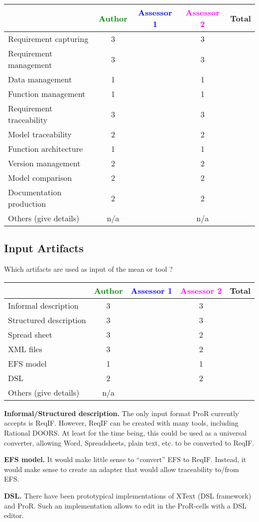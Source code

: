 \begin{tabular}{|l | c | c | c | c|}
\hline
& \textcolor{green}{Author} & \textcolor{blue}{Assessor 1} & \textcolor{magenta}{Assessor 2} & Total \\
\hline
Requirement capturing & 3 & & 3 &  \\
\hline
Requirement management  & 3 & & 3 & \\
\hline
Data management & 1 & & 1 & \\
\hline
Function management & 1 & & 1 & \\
\hline
Requirement traceability  & 3 & & 3 & \\
\hline
Model traceability & 2 & & 2 & \\
\hline
Function architecture & 1 & & 1 & \\
\hline
Version management & 2 & & 2 & \\
\hline
Model comparison & 2 & & 2 & \\
\hline
Documentation production & 2 & & 2 & \\
\hline
Others (give details) & n/a & & n/a & \\
\hline
\end{tabular}

\subsection{Input Artifacts}

Which artifacts are used as input of the mean or tool  ?


\begin{tabular}{|l | c | c | c | c|}
\hline
& \textcolor{green}{Author} & \textcolor{blue}{Assessor 1} & \textcolor{magenta}{Assessor 2} & Total \\
\hline
Informal description & 3 & & 3 &  \\
\hline
Structured description & 3 & & 3 & \\
\hline
Spread sheet & 3 & & 2 & \\
\hline
XML files & 3 & & 2 & \\
\hline
EFS model & 1 & & 1 & \\
\hline
DSL & 2 & & 2 & \\
\hline
Others (give details) & n/a & & & \\
\hline
\end{tabular}

\begin{author_comment}

\textbf{Informal/Structured description.} The only input format ProR currently accepts is ReqIF.  However, ReqIF can be created with many tools, including Rational DOORS.  At least for the time being, this could be used as a universal converter, allowing Word, Spreadsheets, plain text, etc. to be converted to ReqIF.

\textbf{EFS model.} It would make little sense to ``convert'' EFS to ReqIF.  Instead, it would make sense to create an adapter that would allow traceability to/from EFS.

\textbf{DSL.} There have been prototypical implementations of XText (DSL framework) and ProR.  Such an implementation allows to edit in the ProR-cells with a DSL editor.
\end{author_comment}

